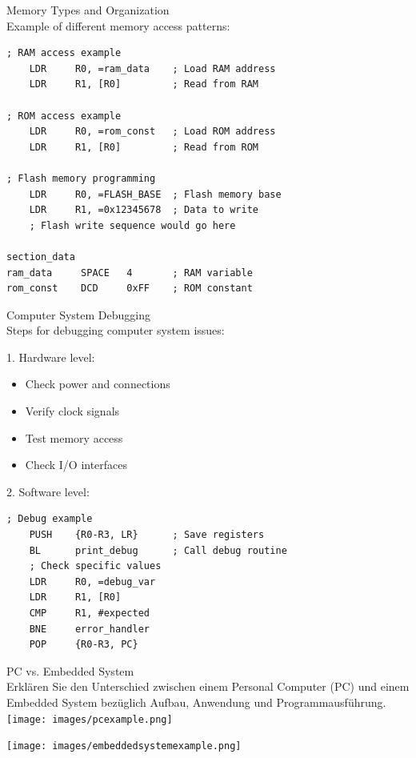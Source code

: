 \begin{example2}{Memory Types and Organization}\\
Example of different memory access patterns:

\begin{lstlisting}[language=armasm, style=basesmol]
; RAM access example
    LDR     R0, =ram_data    ; Load RAM address
    LDR     R1, [R0]         ; Read from RAM
    
; ROM access example
    LDR     R0, =rom_const   ; Load ROM address
    LDR     R1, [R0]         ; Read from ROM
    
; Flash memory programming
    LDR     R0, =FLASH_BASE  ; Flash memory base
    LDR     R1, =0x12345678  ; Data to write
    ; Flash write sequence would go here
    
section_data
ram_data     SPACE   4       ; RAM variable
rom_const    DCD     0xFF    ; ROM constant
\end{lstlisting}
\end{example2}

\begin{KR}{Computer System Debugging}\\
Steps for debugging computer system issues:

1. Hardware level:
\begin{itemize}
  \item Check power and connections
  \item Verify clock signals
  \item Test memory access
  \item Check I/O interfaces
\end{itemize}

2. Software level:
\begin{lstlisting}[language=armasm, style=basesmol]
    ; Debug example
    PUSH    {R0-R3, LR}      ; Save registers
    BL      print_debug      ; Call debug routine
    ; Check specific values
    LDR     R0, =debug_var
    LDR     R1, [R0]
    CMP     R1, #expected
    BNE     error_handler
    POP     {R0-R3, PC}
\end{lstlisting}
\end{KR}

\begin{example2}{PC vs. Embedded System}\\
Erklären Sie den Unterschied zwischen einem Personal Computer (PC) und einem Embedded System bezüglich Aufbau, Anwendung und Programmausführung.\\
\texttt{[image: images/pcexample.png]}

\texttt{[image: images/embeddedsystemexample.png]}
\end{example2}



